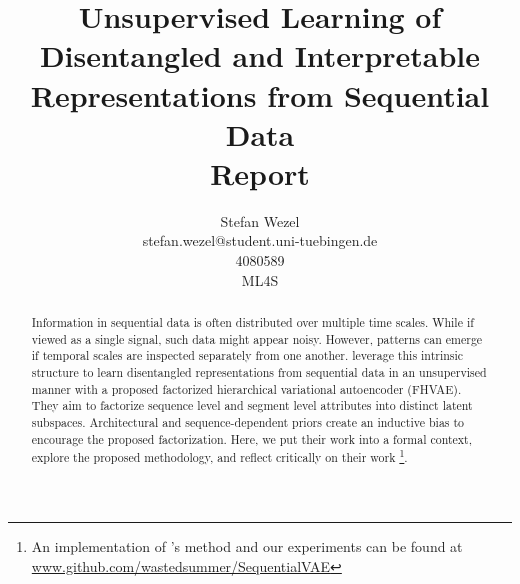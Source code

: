 \documentclass{article} %
\title{Unsupervised Learning of Disentangled and Interpretable Representations from Sequential Data\\ \vspace{0.5cm}\large{Report}}
\author{Stefan Wezel \\ stefan.wezel@student.uni-tuebingen.de \\4080589  \\ ML4S}
\def\figwidth{.5\linewidth}
\def\figheight{.15\textheight}
\begin{document}
\maketitle

\begin{abstract}

%



Information in sequential data is often distributed over multiple time scales.
While if viewed as a single signal, such data might appear noisy. However, patterns can emerge if temporal scales are inspected separately from one another.
\citet{hsu2017unsupervised} leverage this intrinsic structure to learn disentangled representations from sequential data in an unsupervised manner with a proposed factorized hierarchical variational autoencoder (FHVAE). They aim to factorize sequence level and segment level attributes into distinct latent subspaces. Architectural and sequence-dependent priors create an inductive bias to encourage the proposed factorization. Here, we put their work into a formal context, explore the proposed methodology, and reflect critically on their work \footnote{An implementation of \citet{hsu2017unsupervised}'s method and our experiments can be found at \url{www.github.com/wastedsummer/SequentialVAE}}. %
\end{abstract}
\end{document}
